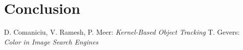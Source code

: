 \documentclass[a4paper,11pt]{article}
\begin{document}
	\section*{Conclusion}

	\begin{thebibliography}{2}
			D. Comaniciu, V. Ramesh, P. Meer: \textit{Kernel-Based Object Tracking}
			T. Gevers: \textit{Color in Image Search Engines}
	\end{thebibliography}
\end{document}
